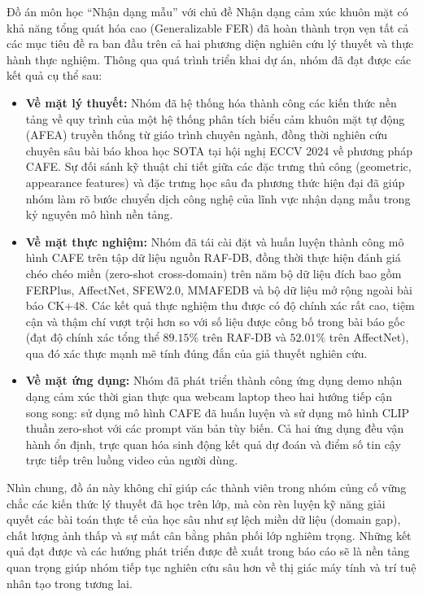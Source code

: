Đồ án môn học ``Nhận dạng mẫu'' với chủ đề Nhận dạng cảm xúc khuôn mặt có khả năng tổng quát hóa cao (Generalizable FER) đã hoàn thành trọn vẹn tất cả các mục tiêu đề ra ban đầu trên cả hai phương diện nghiên cứu lý thuyết và thực hành thực nghiệm. Thông qua quá trình triển khai dự án, nhóm đã đạt được các kết quả cụ thể sau:

\begin{itemize}
    \item \textbf{Về mặt lý thuyết:} Nhóm đã hệ thống hóa thành công các kiến thức nền tảng về quy trình của một hệ thống phân tích biểu cảm khuôn mặt tự động (AFEA) truyền thống từ giáo trình chuyên ngành, đồng thời nghiên cứu chuyên sâu bài báo khoa học SOTA tại hội nghị ECCV 2024 về phương pháp CAFE. Sự đối sánh kỹ thuật chi tiết giữa các đặc trưng thủ công (geometric, appearance features) và đặc trưng học sâu đa phương thức hiện đại đã giúp nhóm làm rõ bước chuyển dịch công nghệ của lĩnh vực nhận dạng mẫu trong kỷ nguyên mô hình nền tảng.
    \item \textbf{Về mặt thực nghiệm:} Nhóm đã tái cài đặt và huấn luyện thành công mô hình CAFE trên tập dữ liệu nguồn RAF-DB, đồng thời thực hiện đánh giá chéo chéo miền (zero-shot cross-domain) trên năm bộ dữ liệu đích bao gồm FERPlus, AffectNet, SFEW2.0, MMAFEDB và bộ dữ liệu mở rộng ngoài bài báo CK+48. Các kết quả thực nghiệm thu được có độ chính xác rất cao, tiệm cận và thậm chí vượt trội hơn so với số liệu được công bố trong bài báo gốc (đạt độ chính xác tổng thể $89.15\%$ trên RAF-DB và $52.01\%$ trên AffectNet), qua đó xác thực mạnh mẽ tính đúng đắn của giả thuyết nghiên cứu.
    \item \textbf{Về mặt ứng dụng:} Nhóm đã phát triển thành công ứng dụng demo nhận dạng cảm xúc thời gian thực qua webcam laptop theo hai hướng tiếp cận song song: sử dụng mô hình CAFE đã huấn luyện và sử dụng mô hình CLIP thuần zero-shot với các prompt văn bản tùy biến. Cả hai ứng dụng đều vận hành ổn định, trực quan hóa sinh động kết quả dự đoán và điểm số tin cậy trực tiếp trên luồng video của người dùng.
\end{itemize}

Nhìn chung, đồ án này không chỉ giúp các thành viên trong nhóm củng cố vững chắc các kiến thức lý thuyết đã học trên lớp, mà còn rèn luyện kỹ năng giải quyết các bài toán thực tế của học sâu như sự lệch miền dữ liệu (domain gap), chất lượng ảnh thấp và sự mất cân bằng phân phối lớp nghiêm trọng. Những kết quả đạt được và các hướng phát triển được đề xuất trong báo cáo sẽ là nền tảng quan trọng giúp nhóm tiếp tục nghiên cứu sâu hơn về thị giác máy tính và trí tuệ nhân tạo trong tương lai.